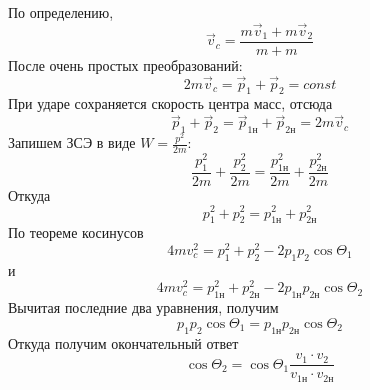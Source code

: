 \documentclass[a5paper,10pt]{article}
\begin{document}
По определению,
\begin{equation}
    \vec{v}_c=\frac{m\vec{v}_1+m\vec{v}_2}{m+m}
\end{equation}
После очень простых преобразований:
\begin{equation}
    2m\vec{v}_c=\vec{p}_1+\vec{p}_2=const
\end{equation}
При ударе сохраняется скорость центра масс, отсюда
\begin{equation}
    \vec{p}_1+\vec{p}_2=
    \vec{p}_{1\text{н}}+\vec{p}_{2\text{н}}=
    2m\vec{v}_c
\end{equation}
Запишем ЗСЭ в виде $W=\frac{p^2}{2m}$:
\begin{equation}
    \frac{p_1^2}{2m}+\frac{p_2^2}{2m}=
    \frac{p_{1\text{н}}^{2}}{2m}+\frac{p_{2\text{н}}^{2}}{2m}
\end{equation}
Откуда
\begin{equation}
    {p_1^2}+{p_2^2}=
    {p_{1\text{н}}^{2}}+{p_{2\text{н}}^{2}}
\end{equation}
По теореме косинусов
\begin{equation}
    4mv_c^2=p_1^2+p_2^2-2p_1p_2\cos\Theta_1
\end{equation}
и
\begin{equation}
    4mv_c^2=p_{1\text{н}}^2+p_{2\text{н}}^2-2p_{1\text{н}}p_{2\text{н}}\cos\Theta_2
\end{equation}
Вычитая последние два уравнения, получим
\begin{equation}
    p_1p_2\cos\Theta_1=p_{1\text{н}}p_{2\text{н}}\cos\Theta_2
\end{equation}
Откуда получим окончательный ответ
\begin{equation}
    \cos\Theta_2=\cos\Theta_1\frac{v_1 \cdot v_2}{v_{1\text{н}} \cdot v_{2\text{н}}}
\end{equation}
\end{document}
